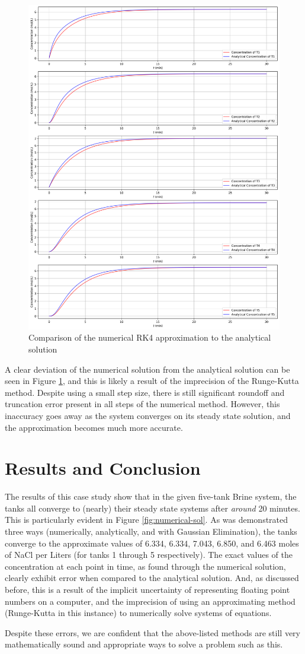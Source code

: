 \documentclass[a4paper, 12pt]{article}
\begin{document}
\begin{figure}[H]
\centering
\includegraphics[width=.9\textwidth]{NumericalVsAnalytical.png}
\caption{Comparison of the numerical RK4 approximation to the analytical solution}
\label{fig:num-vs-anal}
\end{figure}

A clear deviation of the numerical solution from the analytical solution can be seen in Figure \ref{fig:num-vs-anal}, and this is likely a result of the imprecision of the Runge-Kutta method. Despite using a small step size, there is still significant roundoff and truncation error present in all steps of the numerical method. However, this inaccuracy goes away as the system converges on its steady state solution, and the approximation becomes much more accurate.

\section{Results and Conclusion}
The results of this case study show that in the given five-tank Brine system, the tanks all converge to (nearly) their steady state systems after \textit{around} 20 minutes. This is particularly evident in Figure \ref{fig:numerical-sol}. As was demonstrated three ways (numerically, analytically, and with Gaussian Elimination), the tanks converge to the approximate values of 6.334, 6.334, 7.043, 6.850, and 6.463 moles of NaCl per Liters (for tanks 1 through 5 respectively). The exact values of the concentration at each point in time, as found through the numerical solution, clearly exhibit error when compared to the analytical solution. And, as discussed before, this is a result of the implicit uncertainty of representing floating point numbers on a computer, and the imprecision of using an approximating method (Runge-Kutta in this instance) to numerically solve systems of equations.

Despite these errors, we are confident that the above-listed methods are still very mathematically sound and appropriate ways to solve a problem such as this.
\end{document}
